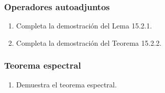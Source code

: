 \documentclass[12pt,libertine]{book}
\begin{document}
\subsubsection*{Operadores autoadjuntos} \label{Sssec: Operadores autoadjuntos}
\begin{enumerate}
    \item Completa la demostración del Lema 15.2.1.
    \item Completa la demostración del Teorema 15.2.2.
\end{enumerate}

\subsubsection*{Teorema espectral}

\begin{enumerate}
    \item Demuestra el teorema espectral.
\end{enumerate}
\end{document}
